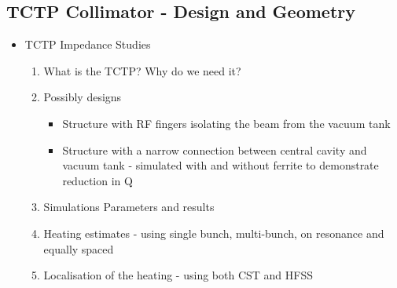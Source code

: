 \subsection{TCTP Collimator - Design and Geometry}


\begin{itemize}
\item{TCTP Impedance Studies}
\begin{enumerate}
\item{What is the TCTP? Why do we need it?}
\item{Possibly designs}
\begin{itemize}
\item{Structure with RF fingers isolating the beam from the vacuum tank}
\item{Structure with a narrow connection between central cavity and vacuum tank - simulated with and without ferrite to demonstrate reduction in Q}
\end{itemize}
\item{Simulations Parameters and results}
\item{Heating estimates - using single bunch, multi-bunch, on resonance and equally spaced}
\item{Localisation of the heating - using both CST and HFSS}

\end{enumerate}
\end{itemize}
%
%
%
%
%
%


